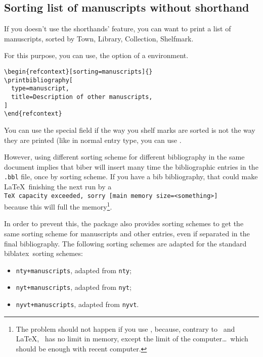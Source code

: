 \documentclass{ltxdockit}[2011/03/25]
\newcommand{\biblatex}{biblatex\xspace}
\begin{document}
\subsection{Sorting list of manuscripts without shorthand}

\label{sorting} If you doesn't use the shorthands' feature, you can want to print a list of manuscripts, sorted by Town, Library, Collection, Shelfmark.

For this purpose, you can use, the option  of a  environment. 

\begin{verbatim}
\begin{refcontext}[sorting=manuscripts]{}
\printbibliography[
  type=manuscript,
  title=Description of other manuscripts,
]
\end{refcontext}
\end{verbatim}

You can use the special field  if the way you shelf marks are sorted is not the way they are printed (like in normal entry type, you can use .

However, using different sorting scheme for different bibliography in the same document implies that biber will insert many time the bibliographic entries in the \verb+.bbl+ file, once by sorting scheme.
If you have a bib bibliography, that could make \LaTeX\ finishing the next run by a\\ \verb`TeX capacity exceeded, sorry [main memory size=<something>]`
\\
because this will full the memory\footnote{The problem should not happen if you use \LuaLaTeX, because, contrary to \XeLaTeX\ and \LaTeX, \LuaLaTeX\ has no limit in memory, except the limit of the computer\ldots\ which should be enough with recent computer.}.

In order to prevent this, the package also provides sorting schemes to get the same sorting scheme for manuscripts and other entries, even if separated in the final bibliography.
The following sorting schemes are adapted for the standard \biblatex\ sorting schemes:
\begin{itemize}
  \item \verb`nty+manuscripts`, adapted from \verb+nty+; 
  \item \verb-nyt+manuscripts-, adapted from \verb-nyt-;
  \item \verb-nyvt+manuscripts-, adapted from \verb-nyvt-.
\end{itemize}
\end{document}
